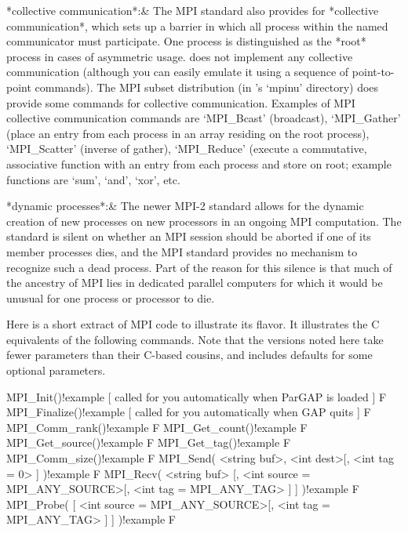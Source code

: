 *collective communication*:& 
    The MPI standard also provides for *collective communication*,  which
    sets up a barrier in which all process within the named  communicator
    must participate. One process is distinguished as the *root*  process
    in cases of  asymmetric  usage.  {\ParGAP}  does  not  implement  any
    collective communication (although you can easily emulate it using  a
    sequence of point-to-point commands). The MPI subset distribution (in
    {\ParGAP}'s  `mpinu'  directory)  does  provide  some  commands   for
    collective communication. Examples of  MPI  collective  communication
    commands are `MPI_Bcast' (broadcast), `MPI_Gather'  (place  an  entry
    from each  process  in  an  array  residing  on  the  root  process),
    `MPI_Scatter'  (inverse   of   gather),   `MPI_Reduce'   (execute   a
    commutative, associative function with an entry from each process and
    store on root; example functions are `sum', `and', `xor', etc.

*dynamic processes*:& 
    The newer MPI-2 standard allows  for  the  dynamic  creation  of  new
    processes on new  processors  in  an  ongoing  MPI  computation.  The
    standard is silent on whether an MPI session should be aborted if one
    of its member processes  dies,  and  the  MPI  standard  provides  no
    mechanism to recognize such a dead process. Part of  the  reason  for
    this silence is that much of the ancestry of MPI  lies  in  dedicated
    parallel computers for which it would be unusual for one  process  or
    processor to die.

\enditems

Here is a short  extract  of  MPI  code  to  illustrate  its  flavor.  It
illustrates the C equivalents of the following {\ParGAP}  commands.  Note
that the {\ParGAP} versions noted here take fewer parameters  than  their
C-based cousins,  and  {\ParGAP}  includes  defaults  for  some  optional
parameters.

\>MPI_Init()!{example} %
              [ called for you automatically when ParGAP is loaded ] F
\>MPI_Finalize()!{example} [ called for you automatically when GAP quits ] F
\>MPI_Comm_rank()!{example} F
\>MPI_Get_count()!{example} F
\>MPI_Get_source()!{example} F
\>MPI_Get_tag()!{example} F
\>MPI_Comm_size()!{example} F
\>MPI_Send( <string buf>, <int dest>[, <int tag = 0> ] )!{example} F
\>MPI_Recv( <string buf> [, <int source = MPI_ANY_SOURCE>[, %
            <int tag = MPI_ANY_TAG> ]  ] )!{example} F
\>MPI_Probe( [ <int source = MPI_ANY_SOURCE>[, %
             <int tag = MPI_ANY_TAG> ] ] )!{example} F

